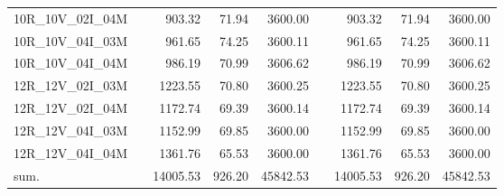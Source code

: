 \begin{tabular}{llrrrlrrr}
10R\_10V\_02I\_04M & \hspace{0.1cm} & 903.32 & 71.94 & 3600.00 & \hspace{0.2cm} & 903.32 & 71.94 & 3600.00\\
10R\_10V\_04I\_03M & \hspace{0.1cm} & 961.65 & 74.25 & 3600.11 & \hspace{0.2cm} & 961.65 & 74.25 & 3600.11\\
10R\_10V\_04I\_04M & \hspace{0.1cm} & 986.19 & 70.99 & 3606.62 & \hspace{0.2cm} & 986.19 & 70.99 & 3606.62\\
\addlinespace
12R\_12V\_02I\_03M & \hspace{0.1cm} & 1223.55 & 70.80 & 3600.25 & \hspace{0.2cm} & 1223.55 & 70.80 & 3600.25\\
12R\_12V\_02I\_04M & \hspace{0.1cm} & 1172.74 & 69.39 & 3600.14 & \hspace{0.2cm} & 1172.74 & 69.39 & 3600.14\\
12R\_12V\_04I\_03M & \hspace{0.1cm} & 1152.99 & 69.85 & 3600.00 & \hspace{0.2cm} & 1152.99 & 69.85 & 3600.00\\
12R\_12V\_04I\_04M & \hspace{0.1cm} & 1361.76 & 65.53 & 3600.00 & \hspace{0.2cm} & 1361.76 & 65.53 & 3600.00\\
\addlinespace
sum. & \hspace{0.1cm} & 14005.53 & 926.20 & 45842.53 & \hspace{0.2cm} & 14005.53 & 926.20 & 45842.53\\
\bottomrule
\end{tabular}
